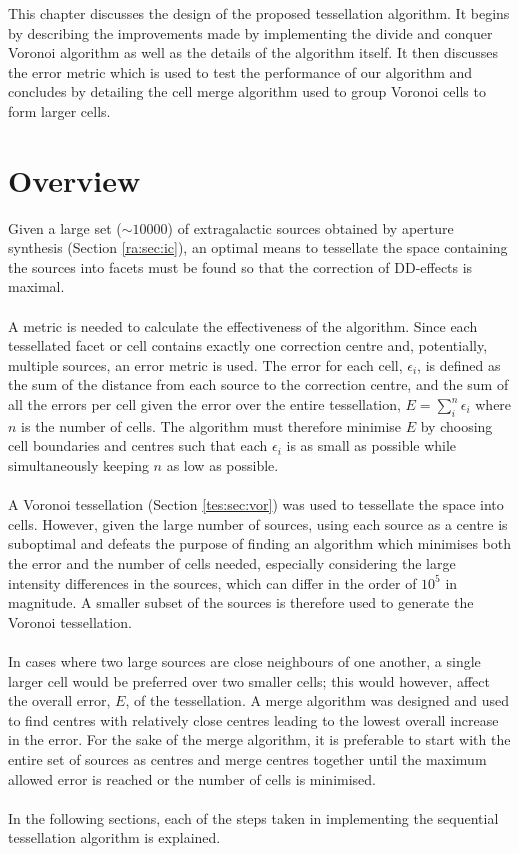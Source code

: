 This chapter discusses the design of the proposed tessellation algorithm. It begins by describing the improvements made by implementing the divide and conquer Voronoi algorithm as well as the details of the algorithm itself. It then discusses the error metric which is used to test the performance of our algorithm and concludes by detailing the cell merge algorithm used to group Voronoi cells to form larger cells.
\section{Overview}
Given a large set ($\sim10000$) of extragalactic sources obtained by aperture synthesis (Section \ref{ra:sec:ic}), an optimal means to tessellate the space containing the sources into facets must be found so that the correction of DD-effects is maximal.
\\
\\
A metric is needed to calculate the effectiveness of the algorithm. Since each tessellated facet or cell contains exactly one correction centre and, potentially, multiple sources, an error metric is used. The error for each cell, $\epsilon_i$, is defined as the sum of the distance from each source to the correction centre, and the sum of all the errors per cell given the error over the entire tessellation, $E = \sum^n_i \epsilon_i$ where $n$ is the number of cells. The algorithm must therefore minimise $E$ by choosing cell boundaries and centres such that each $\epsilon_i$ is as small as possible while simultaneously keeping $n$ as low as possible.
\\
\\
A Voronoi tessellation (Section \ref{tes:sec:vor}) was used to tessellate the space into cells. However, given the large number of sources, using each source as a centre is suboptimal and defeats the purpose of finding an algorithm which minimises both the error and the number of cells needed, especially considering the large intensity differences in the sources, which can differ in the order of $10^5$ in magnitude. A smaller subset of the sources is therefore used to generate the Voronoi tessellation.
\\
\\
In cases where two large sources are close neighbours of one another, a single larger cell would be preferred over two smaller cells; this would however, affect the overall error, $E$, of the tessellation. A merge algorithm was designed and used to find centres with relatively close centres leading to the lowest overall increase in the error. For the sake of the merge algorithm, it is preferable to start with the entire set of sources as centres and merge centres together until the maximum allowed error is reached or the number of cells is minimised.
\\
\\
In the following sections, each of the steps taken in implementing the sequential tessellation algorithm is explained.